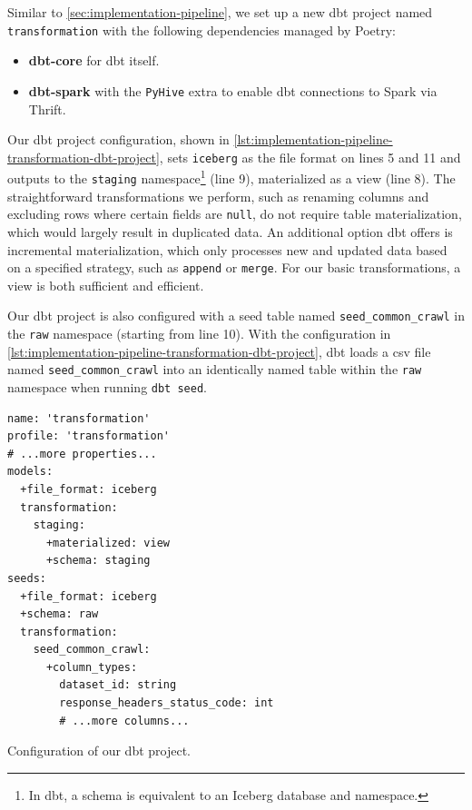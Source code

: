 Similar to \cref{sec:implementation-pipeline}, we set up a new dbt project named \texttt{transformation} with the following dependencies managed by Poetry:

\begin{itemize}
  \item \textbf{dbt-core} for dbt itself.
  \item \textbf{dbt-spark} with the \texttt{PyHive} extra to enable dbt connections to Spark via Thrift.
\end{itemize}

Our dbt project configuration, shown in \cref{lst:implementation-pipeline-transformation-dbt-project}, sets \texttt{iceberg} as the file format on lines 5 and 11 and outputs to the \texttt{staging} namespace\footnote{In dbt, a schema is equivalent to an Iceberg database and namespace.} (line 9), materialized as a view (line 8).
The straightforward transformations we perform, such as renaming columns and excluding rows where certain fields are \texttt{null}, do not require table materialization, which would largely result in duplicated data.
An additional option dbt offers is incremental materialization, which only processes new and updated data based on a specified strategy, such as \texttt{append} or \texttt{merge}.
For our basic transformations, a view is both sufficient and efficient.

Our dbt project is also configured with a seed table named \texttt{seed\_common\_crawl} in the \texttt{raw} namespace (starting from line 10).
With the configuration in \cref{lst:implementation-pipeline-transformation-dbt-project}, dbt loads a \ac{csv} file named \texttt{seed\_common\_crawl} into an identically named table within the \texttt{raw} namespace when running \texttt{dbt seed}.

\begin{listing}[H]
\begin{verbatim}
name: 'transformation'
profile: 'transformation'
# ...more properties...
models:
  +file_format: iceberg
  transformation:
    staging:
      +materialized: view
      +schema: staging
seeds:
  +file_format: iceberg
  +schema: raw
  transformation:
    seed_common_crawl:
      +column_types:
        dataset_id: string
        response_headers_status_code: int
        # ...more columns...
\end{verbatim}
\caption{Configuration of our dbt project.}
\label{lst:implementation-pipeline-transformation-dbt-project}
\end{listing}

